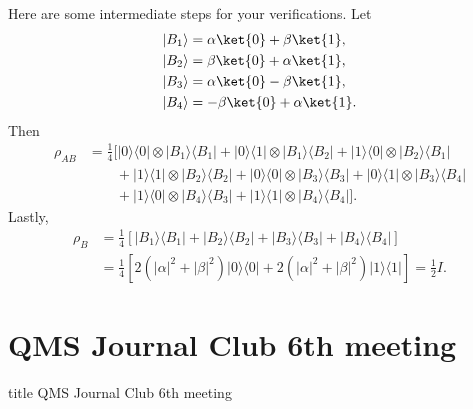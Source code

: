 \documentclass{beamer}
\begin{document}
\begin{frame}
\justify
Here are some intermediate steps for your verifications. Let
\begin{align*}
|B_1\rangle & = \alpha \ket{0} + \beta \ket{1}, \\
|B_2\rangle & = \beta \ket{0} + \alpha \ket{1}, \\
|B_3\rangle & = \alpha \ket{0} - \beta \ket{1}, \\
|B_4\rangle & = -\beta \ket{0} + \alpha \ket{1}.
\end{align*}
\vfill
Then
\begin{align}
\rho_{AB} & = \frac{1}{4}[|0\rangle \langle 0| \otimes |B_1\rangle \langle B_1| + |0\rangle \langle 1| \otimes |B_1\rangle \langle B_2| + |1\rangle \langle 0| \otimes |B_2\rangle \langle B_1| \nonumber \\ & \qquad + |1\rangle \langle 1| \otimes |B_2\rangle \langle B_2| + |0\rangle \langle 0| \otimes |B_3\rangle \langle B_3| + |0\rangle \langle 1| \otimes |B_3\rangle \langle B_4| \nonumber \\ & \qquad + |1\rangle \langle 0| \otimes |B_4\rangle \langle B_3| + |1\rangle \langle 1| \otimes |B_4\rangle \langle B_4|].
\end{align}
\vfill
Lastly,
\begin{align}
\rho_B & = \frac{1}{4}[|B_1\rangle \langle B_1| + |B_2\rangle \langle B_2| + |B_3\rangle \langle B_3| + |B_4\rangle \langle B_4|] \nonumber \\
& = \frac{1}{4} [2(|\alpha|^2 + |\beta|^2) |0\rangle \langle 0| + 2(|\alpha|^2 + |\beta|^2) |1\rangle \langle 1|] = \frac{1}{2}I.
\end{align}
\end{frame}

\section{QMS Journal Club 6th meeting}
\begin{frame}
\vfill
\centering
\begin{beamercolorbox}[sep=8pt,center,shadow=true,rounded=true]{title}
\Large QMS Journal Club 6th meeting
\end{beamercolorbox}
\vfill
\end{frame}
\end{document}
